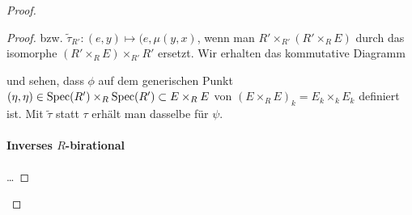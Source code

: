 \documentclass[german]{scrreprt}
\begin{document}
\begin{Satz}
\begin{proof}
\begin{Lemma}
\begin{proof}
        bzw. $\tilde\tau_{R'}\colon(e,y)\mapsto(e,\mu(y,x)$, wenn man
        $R'\times_{R'}(R'\times_R E)$ durch das isomorphe $(R'\times_R
        E)\times_{R'}R'$ ersetzt.
        Wir erhalten das kommutative Diagramm
        \begin{center}
        \end{center}
        und sehen, dass $\phi$ auf dem generischen Punkt
        $(\eta,\eta)\in\operatorname{Spec}(R')\times_R\operatorname{Spec}(R')\subset E\times_R E$
        von $(E\times_R E)_k=E_k\times_k E_k$ definiert ist.
        Mit $\tilde\tau$ statt $\tau$ erhält man dasselbe für $\psi$.
        \paragraph{Inverses $R$-birational}
        …
      \end{proof}
    \end{Lemma}


\end{proof}
\end{Satz}
\end{document}
